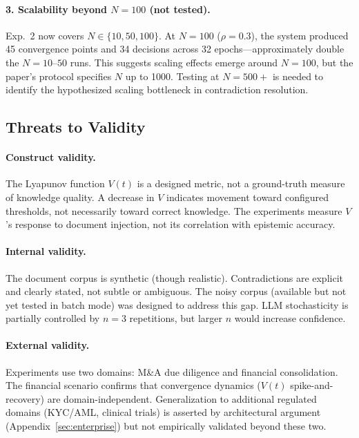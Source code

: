 \documentclass[11pt]{article}
\begin{document}
\paragraph{3. Scalability beyond $N = 100$ (not tested).} Exp.~2 now covers $N \in \{10, 50, 100\}$. At $N = 100$ ($\rho = 0.3$), the system produced 45 convergence points and 34 decisions across 32 epochs---approximately double the $N = 10\text{--}50$ runs. This suggests scaling effects emerge around $N = 100$, but the paper's protocol specifies $N$ up to 1000. Testing at $N = 500+$ is needed to identify the hypothesized scaling bottleneck in contradiction resolution.

\subsection{Threats to Validity}

\paragraph{Construct validity.} The Lyapunov function $V(t)$ is a designed metric, not a ground-truth measure of knowledge quality. A decrease in $V$ indicates movement toward configured thresholds, not necessarily toward correct knowledge. The experiments measure $V$'s response to document injection, not its correlation with epistemic accuracy.

\paragraph{Internal validity.} The document corpus is synthetic (though realistic). Contradictions are explicit and clearly stated, not subtle or ambiguous. The noisy corpus (available but not yet tested in batch mode) was designed to address this gap. LLM stochasticity is partially controlled by $n = 3$ repetitions, but larger $n$ would increase confidence.

\paragraph{External validity.} Experiments use two domains: M\&A due diligence and financial consolidation. The financial scenario confirms that convergence dynamics ($V(t)$ spike-and-recovery) are domain-independent. Generalization to additional regulated domains (KYC/AML, clinical trials) is asserted by architectural argument (Appendix~\ref{sec:enterprise}) but not empirically validated beyond these two.
\end{document}
